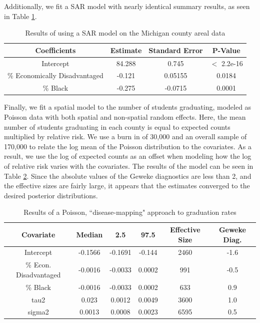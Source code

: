 \documentclass[12pt,letterpaper]{article}
\begin{document}
Additionally, we fit a SAR model with nearly identical summary results, as seen in Table \ref{tab:sar}.

\begin{table}
  \caption{Results of using a SAR model on the Michigan county areal data} 
  \label{tab:sar}
	\centering
 \begin{tabular}{||c c c c||} 
 \hline
 Coefficients & Estimate & Standard Error & P-Value\\ [0.5ex] 
 \hline\hline
 Intercept & 84.288 & 0.745 & $<$ 2.2e-16 \\ 
 \hline
 \% Economically Disadvantaged & -0.121& 0.05155 & 0.0184 \\
 \hline
 \% Black & -0.275 & -0.0715 & 0.0001 \\[0.5ex] 
 \hline
\end{tabular}
\end{table}

Finally, we fit a spatial model to the number of students graduating, modeled as Poisson data with both spatial and non-spatial random effects. Here, the mean number of students graduating in each county is equal to expected counts multiplied by relative risk. We use a burn in of 30,000 and an overall sample of 170,000 to relate the log mean of the Poisson distribution to the covariates. As a result, we use the log of expected counts as an offset when modeling how the log of relative risk varies with the covariates. The results of the model can be seen in Table \ref{tab:poi}. Since the absolute values of the Geweke diagnostics are less than 2, and the effective sizes are fairly large, it appears that the estimates converged to the desired posterior distributions.

\begin{table}
  \caption{Results of a Poisson, ``disease-mapping" approach to graduation rates} 
  \label{tab:poi}
\centering
 \begin{tabular}{||c c c c c c||} 
 \hline
 Covariate & Median & 2.5 & 97.5 & Effective Size & Geweke Diag.\\ [0.5ex] 
 \hline\hline
 Intercept & -0.1566 & -0.1691 & -0.144 & 2460 & -1.6 \\ 
 \hline
 \% Econ. Disadvantaged & -0.0016 & -0.0033 & 0.0002 & 991 &-0.5 \\
 \hline
 \% Black & -0.0016 & -0.0033 & 0.0002 & 633 & 0.9\\
 \hline
 tau2 & 0.023 & 0.0012 & 0.0049 & 3600 & 1.0\\ 
\hline
 sigma2 & 0.0013 & 0.0008 & 0.0023 & 6595 & 0.5\\ [0.5ex] 
 \hline
\end{tabular}
\end{table}
\end{document}
